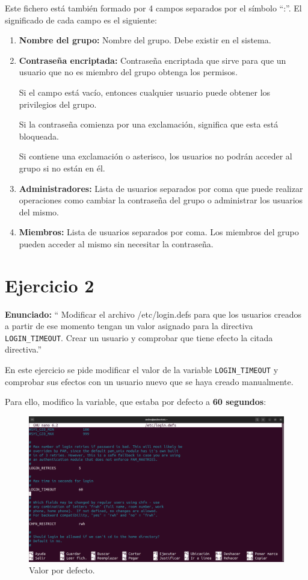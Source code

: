 \documentclass{article}
\begin{document}
Este fichero está también formado por 4 campos separados por el símbolo ``:''. El significado de cada campo es el siguiente:

\begin{enumerate}
    \item \textbf{Nombre del grupo: }Nombre del grupo. Debe existir en el sistema.
    \item \textbf{Contraseña encriptada: }Contraseña encriptada que sirve para que un usuario que no es miembro del grupo obtenga los permisos.
    
    Si el campo está vacío, entonces cualquier usuario puede obtener los privilegios del grupo.

    Si la contraseña comienza por una exclamación, significa que esta está bloqueada.

    Si contiene una exclamación o asterisco, los usuarios no podrán acceder al grupo si no están en él.

    \item \textbf{Administradores: }Lista de usuarios separados por coma que puede realizar operaciones como cambiar la contraseña del grupo o administrar los usuarios del mismo.
    \item \textbf{Miembros: }Lista de usuarios separados por coma. Los miembros del grupo pueden acceder al mismo sin necesitar la contraseña.
\end{enumerate}

\section{Ejercicio 2}

\textbf{Enunciado: }`` Modificar el archivo /etc/login.defs para que los usuarios creados a partir de ese momento tengan un valor asignado para la directiva \texttt{LOGIN\_TIMEOUT}. Crear un usuario y comprobar que tiene efecto la citada directiva.''

\bigskip

En este ejercicio se pide modificar el valor de la variable \verb|LOGIN_TIMEOUT| y comprobar sus efectos con un usuario nuevo que se haya creado manualmente.

\bigskip

Para ello, modifico la variable, que estaba por defecto a \textbf{60 segundos}:

\begin{figure}[H]
    \includegraphics[width=\textwidth]{imagenes/tout60.png}
    \caption{Valor por defecto.}
\end{figure}
\end{document}

